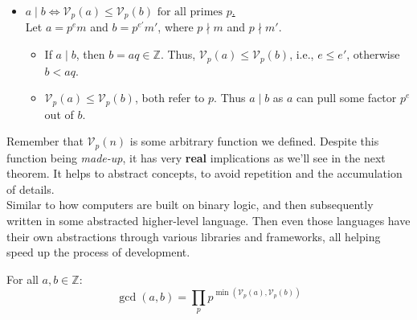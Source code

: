 \begin{Proof}
\begin{itemize}
        \item \underline{$a \mid b \iff \mathcal{V}_p(a) \leq \mathcal{V}_p(b) \text{ for all primes } p$.}\\
        Let $a = p^e m$ and $b = p^{e'} m'$, where $p \nmid m$ and $p \nmid m'$. 
        \vspace{-.5em}
        \begin{itemize}
            \item If $a \mid b$, then $b = aq\in\mathbb{Z}$. Thus, $\mathcal{V}_p(a) \leq \mathcal{V}_p(b)$, i.e., $e\leq e'$, otherwise $b<aq$.
            \item $\mathcal{V}_p(a) \leq \mathcal{V}_p(b)$, both refer to $p$. Thus $a\mid b$ as $a$ can pull some factor $p^e$ out of $b$.
        \end{itemize}
    \end{itemize}
\end{Proof}

\begin{Tip}
    Remember that $\mathcal{V}_p(n)$ is some arbitrary function we defined.
    Despite this function being \textit{made-up}, it has very \textbf{real} implications as we'll see in the next theorem. 
    It helps to abstract concepts, to avoid repetition and the accumulation of details.\\

    \noindent
    Similar to how computers are built on binary logic, and then subsequently written in some
    abstracted higher-level language. Then even those languages have their own abstractions through various libraries and frameworks,
    all helping speed up the process of development.

\end{Tip}

\newpage

\begin{theo}

    \label{theo:GCD_abstracted}

    For all $a,b\in\mathbb{Z}$:
    \[\gcd(a,b) = \prod_{p} p^{\min(\mathcal{V}_p(a),\mathcal{V}_p(b))}\]

\end{theo}


